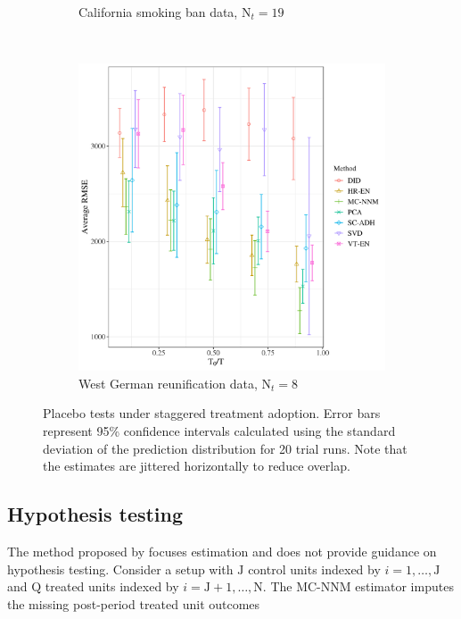 \documentclass[hidelinks,12pt]{article}
\begin{document}
\begin{figure}[htbp]
\begin{subfigure}[t]{0.48\textwidth}
		\caption{California smoking ban data, $\text{N}_t = 19$}
	\end{subfigure}
	~ 
	\begin{subfigure}[t]{0.48\textwidth}
		\centering
		\includegraphics[width=\textwidth]{plots/germany_N_16_T_44_numruns_20_num_treated_8_simultaneuous_0.png}
		\caption{West German reunification data, $\text{N}_t = 8$}
	\end{subfigure}
	\caption{Placebo tests under staggered treatment adoption. Error bars represent 95\% confidence intervals calculated using the standard deviation of the prediction distribution for 20 trial runs. Note that the estimates are jittered horizontally to reduce overlap. \label{synth-stag}} 
\end{figure}

\subsection{Hypothesis testing} \label{hyp-test}

The method proposed by \citet{athey2017matrix} focuses estimation and does not provide guidance on hypothesis testing. Consider a setup with $\text{J}$ control units indexed by $i=1, \ldots, \text{J}$ and $\text{Q}$ treated units indexed by $i = \text{J}+1, \ldots, \text{N}$. The MC-NNM estimator imputes the missing post-period treated unit outcomes 
\end{document}
